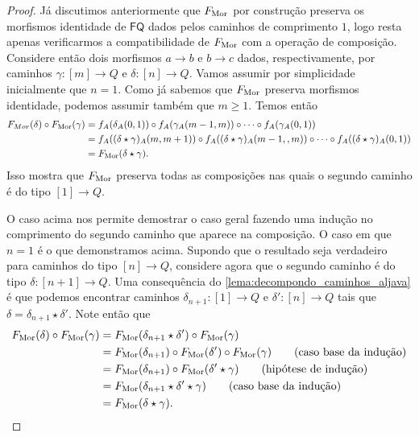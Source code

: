 \begin{proof}
    Já discutimos anteriormente que $F_{\mathrm{Mor}}$ por construção preserva os morfismos identidade de $\mathsf{FQ}$ dados pelos caminhos de comprimento $1$, logo resta apenas verificarmos a compatibilidade de $F_{\mathrm{Mor}}$ com a operação de composição.
    Considere então dois morfismos $a \to b$ e $b \to c$ dados, respectivamente, por caminhos $\gamma: [m] \to Q$ e $\delta: [n] \to Q$.
    Vamos assumir por simplicidade inicialmente que $n=1$.
    Como já sabemos que $F_{\mathrm{Mor}}$ preserva morfismos identidade, podemos assumir também que $m \geq 1$.
    Temos então
    \begin{align*}
        F_{Mor}(\delta) \circ F_{\mathrm{Mor}}(\gamma)
        & = f_A(\delta_A(0,1)) \circ f_A(\gamma_A(m-1,m)) \circ \dotsm \circ f_A(\gamma_A(0,1)) \\
        & = f_A((\delta \star \gamma)_A(m,m+1)) \circ f_A((\delta \star \gamma)_A(m-1,,m)) \circ \dotsm \circ f_A((\delta \star \gamma)_A(0,1)) \\
        & = F_{\mathrm{Mor}}(\delta \star \gamma).
    \end{align*}
    Isso mostra que $F_{\mathrm{Mor}}$ preserva todas as composições nas quais o segundo caminho é do tipo $[1] \to Q$.
    
    O caso acima nos permite demostrar o caso geral fazendo uma indução no comprimento do segundo caminho que aparece na composição.
    O caso em que $n=1$ é o que demonstramos acima.
    Supondo que o resultado seja verdadeiro para caminhos do tipo $[n] \to Q$, considere agora que o segundo caminho é do tipo $\delta: [n+1] \to Q$.
    Uma consequência do \cref{lema:decompondo_caminhos_aljava} é que podemos encontrar caminhos $\delta_{n+1}: [1] \to Q$ e $\delta': [n] \to Q$ tais que $\delta = \delta_{n+1} \star \delta'$.
    Note então que
    \begin{align*}
        F_{\mathrm{Mor}}(\delta) \circ F_{\mathrm{Mor}}(\gamma)
        & = F_{\mathrm{Mor}}(\delta_{n+1} \star \delta') \circ F_{\mathrm{Mor}}(\gamma) \\
        & = F_{\mathrm{Mor}}(\delta_{n+1}) \circ F_{\mathrm{Mor}}(\delta') \circ F_{\mathrm{Mor}}(\gamma)
        \tag{caso base da indução} \\
        & = F_{\mathrm{Mor}}(\delta_{n+1}) \circ F_{\mathrm{Mor}}(\delta' \star \gamma)
        \tag{hipótese de indução} \\
        & = F_{\mathrm{Mor}}(\delta_{n+1} \star \delta' \star \gamma)
        \tag{caso base da indução} \\
        & = F_{\mathrm{Mor}}(\delta \star \gamma).
    \end{align*}


\end{proof}

